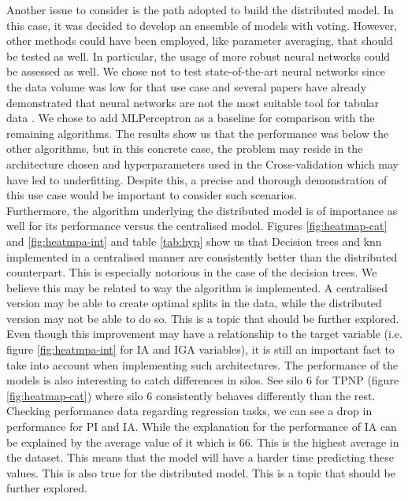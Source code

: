 Another issue to consider is the path adopted to build the distributed model. In this case, it was decided to develop an ensemble of models with voting. However, other methods could have been employed, like parameter averaging, that should be tested as well. In particular, the usage of more robust neural networks could be assessed as well. We chose not to test state-of-the-art neural networks since the data volume was low for that use case and several papers have already demonstrated that neural networks are not the most suitable tool for tabular data \cite{grinsztajnWhyTreebasedModels2022,borisovDeepNeuralNetworks2022}. We chose to add MLPerceptron as a baseline for comparison with the remaining algorithms. The results show us that the performance was below the other algorithms, but in this concrete case, the problem may reside in the architecture chosen and hyperparameters used in the Cross-validation which may have led to underfitting. Despite this, a precise and thorough demonstration of this use case would be important to consider such scenarios. \\
Furthermore, the algorithm underlying the distributed model is of importance as well for its performance versus the centralised model. Figures \ref{fig:heatmap-cat} and \ref{fig:heatmpa-int} and table \ref{tab:hyp} show us that Decision trees and \ac{knn} implemented in a centralised manner are consistently better than the distributed counterpart. This is especially notorious in the case of the decision trees. We believe this may be related to way the algorithm is implemented. A centralised version may be able to create optimal splits in the data, while the distributed version may not be able to do so. This is a topic that should be further explored.\\
Even though this improvement may have a relationship to the target variable (i.e. figure \ref{fig:heatmpa-int} for IA and IGA variables), it is still an important fact to take into account when implementing such architectures.
The performance of the models is also interesting to catch differences in silos. See silo 6 for TPNP (figure \ref{fig:heatmap-cat}) where silo 6 consistently behaves differently than the rest.
Checking performance data regarding regression tasks, we can see a drop in performance for PI and IA. While the explanation for the performance of IA can be explained by the average value of it which is 66. This is the highest average in the dataset. This means that the model will have a harder time predicting these values. This is also true for the distributed model. This is a topic that should be further explored.\\
